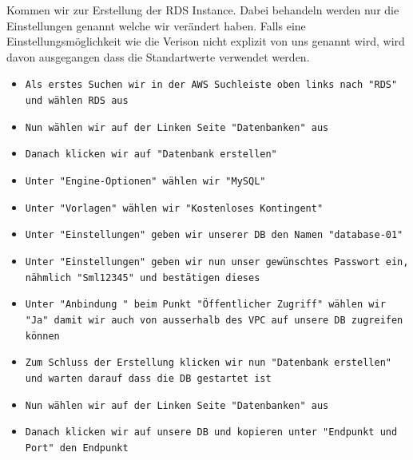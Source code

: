 \documentclass{article}
\begin{document}
\noindent Kommen wir zur Erstellung der RDS Instance. Dabei behandeln werden nur die Einstellungen genannt welche wir verändert haben. Falls eine Einstellungsmöglichkeit wie die Verison nicht explizit von uns genannt wird, wird davon ausgegangen dass die Standartwerte verwendet werden.
\newline
\newline
\begin{itemize}
\item \texttt{Als erstes Suchen wir in der AWS Suchleiste oben links nach "RDS" und wählen RDS aus} \\

\item \texttt{Nun wählen wir auf der Linken Seite "Datenbanken" aus} \\

\item \texttt{Danach klicken wir auf  "Datenbank erstellen"} \\

\item \texttt{Unter "Engine-Optionen" wählen wir "MySQL"} \\

\item \texttt{Unter "Vorlagen" wählen wir "Kostenloses Kontingent"} \\

\item \texttt{Unter "Einstellungen" geben wir unserer DB den Namen "database-01"} \\

\item \texttt{Unter "Einstellungen" geben wir nun unser gewünschtes Passwort ein, nähmlich "Sml12345" und bestätigen dieses} \\

\item \texttt{Unter "Anbindung " beim Punkt "Öffentlicher Zugriff" wählen wir "Ja" damit wir auch von ausserhalb des VPC auf unsere DB zugreifen können} \\

\item \texttt{Zum Schluss der Erstellung klicken wir nun "Datenbank erstellen" und warten darauf dass die DB gestartet ist } \\

\item \texttt{Nun wählen wir auf der Linken Seite "Datenbanken" aus} \\

\item \texttt{Danach klicken wir auf unsere DB und kopieren unter "Endpunkt und Port" den Endpunkt} \\


\end{itemize}
\end{document}

